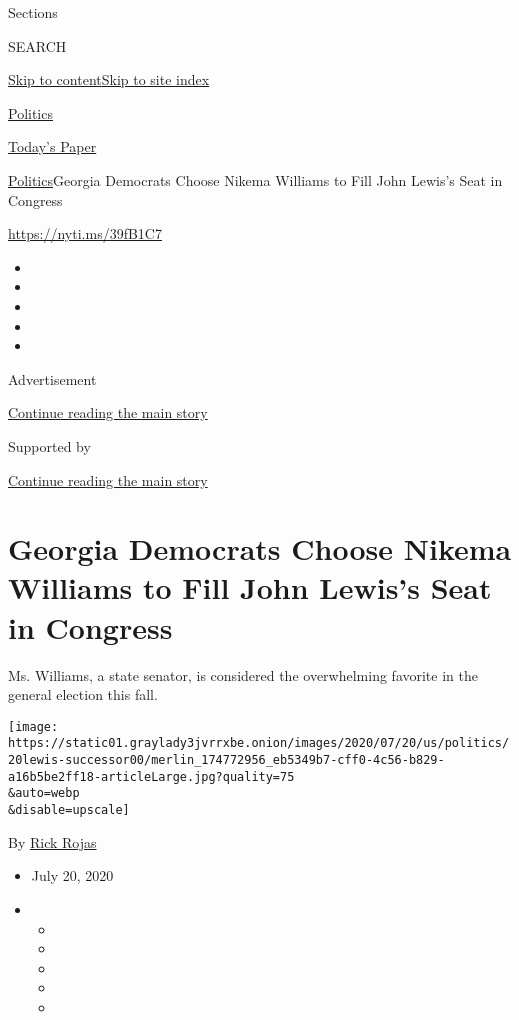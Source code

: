 Sections

SEARCH

\protect\hyperlink{site-content}{Skip to
content}\protect\hyperlink{site-index}{Skip to site index}

\href{https://www.nytimes3xbfgragh.onion/section/politics}{Politics}

\href{https://myaccount.nytimes3xbfgragh.onion/auth/login?response_type=cookie\&client_id=vi}{}

\href{https://www.nytimes3xbfgragh.onion/section/todayspaper}{Today's
Paper}

\href{/section/politics}{Politics}\textbar{}Georgia Democrats Choose
Nikema Williams to Fill John Lewis's Seat in Congress

\url{https://nyti.ms/39fB1C7}

\begin{itemize}
\item
\item
\item
\item
\item
\end{itemize}

Advertisement

\protect\hyperlink{after-top}{Continue reading the main story}

Supported by

\protect\hyperlink{after-sponsor}{Continue reading the main story}

\hypertarget{georgia-democrats-choose-nikema-williams-to-fill-john-lewiss-seat-in-congress}{%
\section{Georgia Democrats Choose Nikema Williams to Fill John Lewis's
Seat in
Congress}\label{georgia-democrats-choose-nikema-williams-to-fill-john-lewiss-seat-in-congress}}

Ms. Williams, a state senator, is considered the overwhelming favorite
in the general election this fall.

\texttt{[image: https://static01.graylady3jvrrxbe.onion/images/2020/07/20/us/politics/20lewis-successor00/merlin\_174772956\_eb5349b7-cff0-4c56-b829-a16b5be2ff18-articleLarge.jpg?quality=75\\\&auto=webp\\\&disable=upscale]}

By \href{https://www.nytimes3xbfgragh.onion/by/rick-rojas}{Rick Rojas}

\begin{itemize}
\item
  July 20, 2020
\item
  \begin{itemize}
  \item
  \item
  \item
  \item
  \item
  \end{itemize}
\end{itemize}

